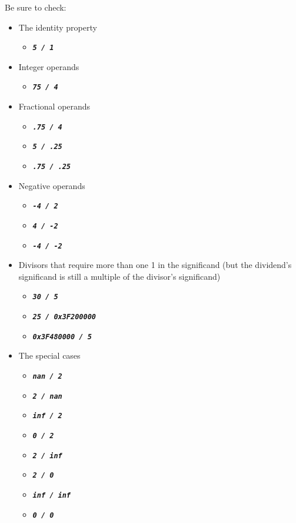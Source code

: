 Be sure to check:
\begin{itemize}
    \item The identity property
    \begin{itemize}
        \item[] \texttt{\textbf{\textit{5 / 1}}}
    \end{itemize}
    \item Integer operands
    \begin{itemize}
        \item[] \texttt{\textbf{\textit{75 / 4}}}
    \end{itemize}
    \item Fractional operands
    \begin{itemize}
        \item[] \texttt{\textbf{\textit{.75 / 4}}}
        \item[] \texttt{\textbf{\textit{5 / .25}}}
        \item[] \texttt{\textbf{\textit{.75 / .25}}}
    \end{itemize}
    \item Negative operands
    \begin{itemize}
        \item[] \texttt{\textbf{\textit{-4 / 2}}}
        \item[] \texttt{\textbf{\textit{4 / -2}}}
        \item[] \texttt{\textbf{\textit{-4 / -2}}}
    \end{itemize}
    \item Divisors that require more than one 1 in the significand (but the dividend's significand is still a multiple of the divisor's significand)
    \begin{itemize}
        \item[] \texttt{\textbf{\textit{30 / 5}}}
        \item[] \texttt{\textbf{\textit{25 / 0x3F200000}}}
        \item[] \texttt{\textbf{\textit{0x3F480000 / 5}}}
    \end{itemize}
    \item The special cases
    \begin{itemize}
        \item[] \texttt{\textbf{\textit{nan / 2}}}
        \item[] \texttt{\textbf{\textit{2 / nan}}}
        \item[] \texttt{\textbf{\textit{inf / 2}}}
        \item[] \texttt{\textbf{\textit{0 / 2}}}
        \item[] \texttt{\textbf{\textit{2 / inf}}}
        \item[] \texttt{\textbf{\textit{2 / 0}}}
        \item[] \texttt{\textbf{\textit{inf / inf}}}
        \item[] \texttt{\textbf{\textit{0 / 0}}}
    \end{itemize}
\end{itemize}
